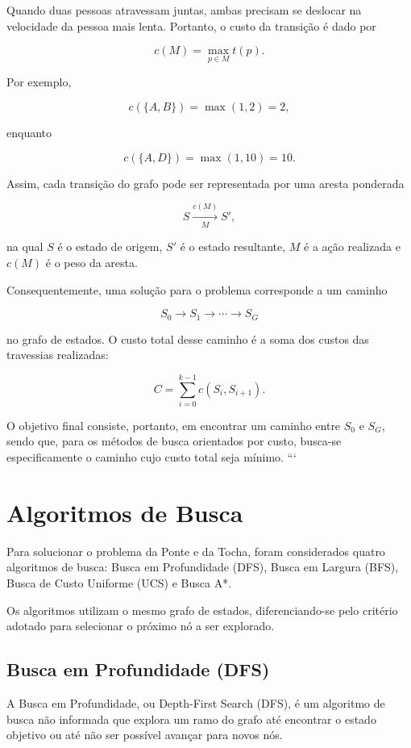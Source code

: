 \documentclass{article}
\begin{document}
Quando duas pessoas atravessam juntas, ambas precisam se deslocar na velocidade da pessoa mais lenta. Portanto, o custo da transição é dado por

\[
c(M)=\max_{p\in M} t(p).
\]

Por exemplo,

\[
c(\{A,B\})=\max(1,2)=2,
\]

enquanto

\[
c(\{A,D\})=\max(1,10)=10.
\]

Assim, cada transição do grafo pode ser representada por uma aresta ponderada

\[
S \xrightarrow[M]{c(M)} S',
\]

na qual $S$ é o estado de origem, $S'$ é o estado resultante, $M$ é a ação realizada e $c(M)$ é o peso da aresta.

Consequentemente, uma solução para o problema corresponde a um caminho

\[
S_0 \rightarrow S_1 \rightarrow \cdots \rightarrow S_G
\]

no grafo de estados. O custo total desse caminho é a soma dos custos das travessias realizadas:

\[
C = \sum_{i=0}^{k-1} c(S_i,S_{i+1}).
\]

O objetivo final consiste, portanto, em encontrar um caminho entre $S_0$ e $S_G$, sendo que, para os métodos de busca orientados por custo, busca-se especificamente o caminho cujo custo total seja mínimo.
```

\section{Algoritmos de Busca}

Para solucionar o problema da Ponte e da Tocha, foram
considerados quatro algoritmos de busca: Busca em
Profundidade (DFS), Busca em Largura (BFS), Busca de
Custo Uniforme (UCS) e Busca A*.

Os algoritmos utilizam o mesmo grafo de estados,
diferenciando-se pelo critério adotado para selecionar
o próximo nó a ser explorado.

\subsection{Busca em Profundidade (DFS)}

A Busca em Profundidade, ou Depth-First Search (DFS),
é um algoritmo de busca não informada que explora
um ramo do grafo até encontrar o estado objetivo
ou até não ser possível avançar para novos nós.
\end{document}
